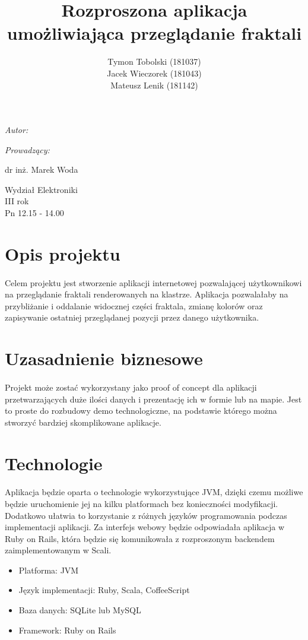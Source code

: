 \documentclass[wide,a4paper,titlepage,12pt]{article}
\title{Rozproszona aplikacja umożliwiająca przeglądanie fraktali}
\author{Tymon Tobolski {\small(181037)}\\ Jacek Wieczorek {\small(181043)} \\
Mateusz Lenik {\small(181142)}}
\makeatletter
\renewcommand{\maketitle}{
  \begin{titlepage}
    \begin{center}
      \vspace*{3cm}
      \LARGE \@title \par
      \vspace{2cm}
      \textit{\small Autor:}\par
      \normalsize \@author\par \normalsize
      \vspace{3cm}
      \textit{\small Prowadzący:}\par
      dr inż. Marek Woda \par
      \vspace{2cm}
      Wydział Elektroniki\\ III rok\\ Pn 12.15 - 14.00\par

    \end{center}
  \end{titlepage}
}
\makeatother
\begin{document}
\maketitle
\tableofcontents
\newpage

\section{Opis projektu}
\paragraph{}
Celem projektu jest stworzenie aplikacji internetowej pozwalającej użytkownikowi
na przeglądanie fraktali renderowanych na klastrze. Aplikacja
pozwalałaby na przybliżanie i oddalanie widocznej części fraktala, zmianę
kolorów oraz zapisywanie ostatniej przeglądanej pozycji przez danego
użytkownika.

\section{Uzasadnienie biznesowe}
\paragraph{}
Projekt może zostać wykorzystany jako proof of concept dla aplikacji
przetwarzających duże ilości danych i prezentację ich w formie lub na mapie.
Jest to proste do rozbudowy demo technologiczne, na podstawie którego można
stworzyć bardziej skomplikowane aplikacje.

\section{Technologie}
\paragraph{}
Aplikacja będzie oparta o technologie wykorzystujące JVM, dzięki czemu możliwe
będzie uruchomienie jej na kilku platformach bez konieczności modyfikacji.
Dodatkowo ułatwia to korzystanie z różnych języków programowania podczas
implementacji aplikacji. Za interfejs webowy będzie odpowiadała aplikacja w Ruby
on Rails, która będzie się komunikowała z rozproszonym backendem
zaimplementowanym w Scali.

\begin{itemize}
  \item Platforma: JVM
  \item Język implementacji: Ruby, Scala, CoffeeScript
  \item Baza danych: SQLite lub MySQL
  \item Framework: Ruby on Rails
\end{itemize}
\end{document}
